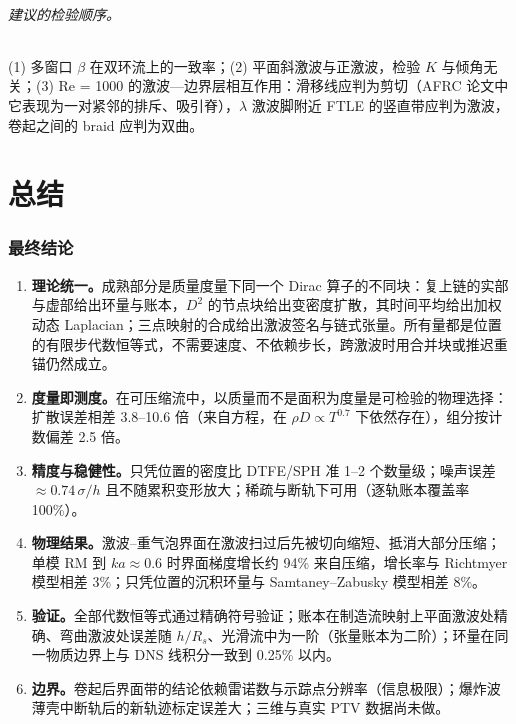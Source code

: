 \paragraph{建议的检验顺序。}(1) 多窗口 $\beta$ 在双环流上的一致率；(2) 平面斜激波与正激波，检验 $K$ 与倾角无关；(3) Re = 1000 的激波—边界层相互作用：滑移线应判为剪切（AFRC 论文中它表现为一对紧邻的排斥、吸引脊），$\lambda$ 激波脚附近 FTLE 的竖直带应判为激波，卷起之间的 braid 应判为双曲。



\clearpage\part{总结}
\section{最终结论}
\begin{enumerate}
\item \textbf{理论统一。}成熟部分是质量度量下同一个 Dirac 算子的不同块：复上链的实部与虚部给出环量与账本，$D^2$ 的节点块给出变密度扩散，其时间平均给出加权动态 Laplacian；三点映射的合成给出激波签名与链式张量。所有量都是位置的有限步代数恒等式，不需要速度、不依赖步长，跨激波时用合并块或推迟重锚仍然成立。
\item \textbf{度量即测度。}在可压缩流中，以质量而不是面积为度量是可检验的物理选择：扩散误差相差 3.8--10.6 倍（来自方程，在 $\rho D\propto T^{0.7}$ 下依然存在），组分按计数偏差 2.5 倍。
\item \textbf{精度与稳健性。}只凭位置的密度比 DTFE/SPH 准 1–2 个数量级；噪声误差 $\approx0.74\,\sigma/h$ 且不随累积变形放大；稀疏与断轨下可用（逐轨账本覆盖率 100\%）。
\item \textbf{物理结果。}激波–重气泡界面在激波扫过后先被切向缩短、抵消大部分压缩；单模 RM 到 $ka\approx0.6$ 时界面梯度增长约 94\% 来自压缩，增长率与 Richtmyer 模型相差 3\%；只凭位置的沉积环量与 Samtaney–Zabusky 模型相差 8\%。
\item \textbf{验证。}全部代数恒等式通过精确符号验证；账本在制造流映射上平面激波处精确、弯曲激波处误差随 $h/R_s$、光滑流中为一阶（张量账本为二阶）；环量在同一物质边界上与 DNS 线积分一致到 0.25\% 以内。\item \textbf{边界。}卷起后界面带的结论依赖雷诺数与示踪点分辨率（信息极限）；爆炸波薄壳中断轨后的新轨迹标定误差大；三维与真实 PTV 数据尚未做。
\end{enumerate}

